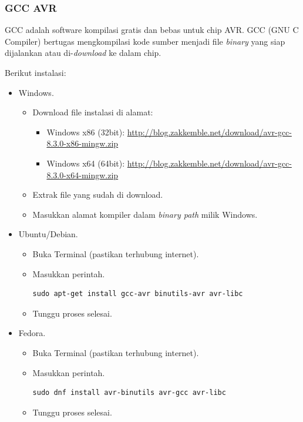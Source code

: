 \documentclass[12pt,]{article}
\begin{document}
	\subsubsection{GCC AVR}
	GCC adalah software kompilasi gratis dan bebas untuk chip AVR.
	GCC (GNU C Compiler) bertugas mengkompilasi kode sumber menjadi file \textit{binary} yang siap dijalankan atau di-\textit{download} ke dalam chip.

	Berikut instalasi:
	\begin{itemize}
		\item Windows.
		\begin{itemize}
			\item Download file instalasi di alamat:
			\begin{itemize}
				\item Windows x86 (32bit): \url{http://blog.zakkemble.net/download/avr-gcc-8.3.0-x86-mingw.zip}
				\item Windows x64 (64bit): \url{http://blog.zakkemble.net/download/avr-gcc-8.3.0-x64-mingw.zip}
			\end{itemize}
			\item Extrak file yang sudah di download.
			\item Masukkan alamat kompiler dalam \textit{binary path} milik Windows.
		\end{itemize}
	
		\item Ubuntu/Debian.
		\begin{itemize}
			\item Buka Terminal (pastikan terhubung internet).
			\item Masukkan perintah.
			\begin{verbatim}
sudo apt-get install gcc-avr binutils-avr avr-libc
			\end{verbatim}
			\item Tunggu proses selesai.
		\end{itemize}
		
		\item Fedora.
		\begin{itemize}
			\item Buka Terminal (pastikan terhubung internet).
			\item Masukkan perintah.
			\begin{verbatim}
sudo dnf install avr-binutils avr-gcc avr-libc
			\end{verbatim}
			\item Tunggu proses selesai.
		\end{itemize}
		

\end{itemize}
\end{document}
